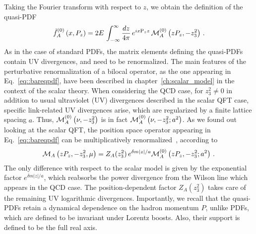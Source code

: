 %
Taking
the Fourier transform with respect to $z$, we obtain the definition of the
quasi-PDF  
\begin{align}
	\label{eq::bareqpdf}                                                 
	\tilde{f}_A^{(0)}\left( x, P_z\right) = 
	2 E \, \int_{-\infty}^{\infty}\frac{dz}{4\pi}\,e^{i x \text{P}_z z}\,\mathcal{M}_A^{(0)}\left( zP_z,-z_3^2 \right)\,. 
\end{align}
As in the case of standard PDFs,
the matrix elements defining the quasi-PDFs contain UV divergences, and need to be renormalized. The
main features of the perturbative renormalization of a bilocal operator, 
as the one appearing in Eq.~\eqref{eq::bareqpdf}, have been described in chapter~\ref{ch:scalar_model}
in the context of the scalar theory.
When considering the QCD case, for $z_3^2  \neq 0$ 
in addition to usual ultraviolet (UV) divergences described in the scalar QFT case, 
specific link-related UV divergences arise, which are regularized by a finite lattice spacing $a$. 
Thus, $\mathcal{M}_A^{(0)}\left( \nu,-z_3^2 \right)$ is in fact $\mathcal{M}_A^{(0)}\left( \nu,-z_3^2; a^2 \right)$.
As we found out looking at the scalar QFT,
the position space operator appearing in Eq.~\eqref{eq::bareqpdf} can be multiplicatively
renormalized~\cite{Ishikawa:2017faj}, according to
\begin{align}
    \mathcal{M}_A\left( z P_z,-z_3^2, \mu \right) = Z_{A}(z_3^2)\,
    e^{\delta m |z|/a} \mathcal{M}_A^{(0)}\left( z P_z,-z_3^2; a^2 \right)\,.
\end{align}
The only difference with respect to the scalar model is given by
the exponential factor $e^{\delta m |z|/a}$, which reabsorbs the power divergence
from the Wilson line which appears in the QCD case. The position-dependent factor $Z_{A}(z_3^2)$ takes care of
the remaining UV logarithmic divergences.  
%
Importantly, we recall that the quasi-PDFs retain a dynamical dependence on the hadron momentum
$P$, unlike PDFs, which are defined to be invariant under Lorentz boosts. Also,
their support is defined to be the full real axis.

